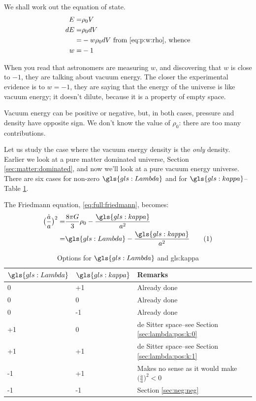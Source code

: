 \documentclass[]{article}
\newcommand\numberthis{\addtocounter{equation}{1}\tag{\theequation}}
\begin{document}
We shall work out the equation of state.
\begin{align*}
	E =& \rho_0V\\
	dE =& \rho_0 dV \\
	=&-w \rho_0 dV \text{ from \eqref{eq:p:w:rho}, whence}\\
	w=&-1
\end{align*}

When you read that astronomers are measuring $w$, and discovering that $w$ is close to $-1$, they are talking about vacuum energy. The closer the experimental evidence is to $w=-1$, they are saying that the energy of the universe is like vacuum energy; it doesn't dilute, because it is a property of empty space.

Vacuum energy can be positive or negative, but, in both cases, pressure and density have opposite sign. We don't know the value of $\rho_0$: there are too many contributions.

Let us study the case where the vacuum energy density is the \emph{only} density. Earlier we look at a pure matter dominated universe, Section \ref{sec:matter:dominated}, and now we'll look at a pure vacuum energy universe. There are six cases for non-zero $\gls{gls:Lambda}$ and  for $\gls{gls:kappa}$--Table \ref{table eq:options:lambda:kappa}.

The Friedmann equation, \eqref{eq:full:friedmann}, becomes:
\begin{align*}
	\big(\frac{\dot{a}}{a}\big)^2  =& \frac{8\pi G}{3} \rho_0 - \frac{\gls{gls:kappa}}{a^2}\\
	=& \gls{gls:Lambda} - \frac{\gls{gls:kappa}}{a^2} \numberthis \label{eq:friedmann:avec:lambda}
\end{align*}

\begin{table}[H]
	\begin{center}
		\caption{Options for $\gls{gls:Lambda}$ and \gls{gls:kappa}}\label{table eq:options:lambda:kappa}
		\begin{tabular}{||l|l|p{5cm}||} \hline
			$\gls{gls:Lambda}$ & $\gls{gls:kappa}$ & Remarks\\ \hline
			0 & +1 & Already done\\\hline
			0 & 0 & Already done\\\hline
			0 & -1 & Already done\\\hline
			+1 & 0 &de Sitter space--see Section \ref{sec:lambda:pos:k:0}\\\hline
			+1 & +1 &de Sitter space--see Section \ref{sec:lambda:pos:k:1} \\\hline
			-1 & +1 & Makes no sense as it would make $\big(\frac{\dot{a}}{a}\big)^2<0$\\\hline
			-1&-1&Section \ref{sec:neg:neg} \\\hline
			\hline
		\end{tabular}
	\end{center}
\end{table}
\end{document}
